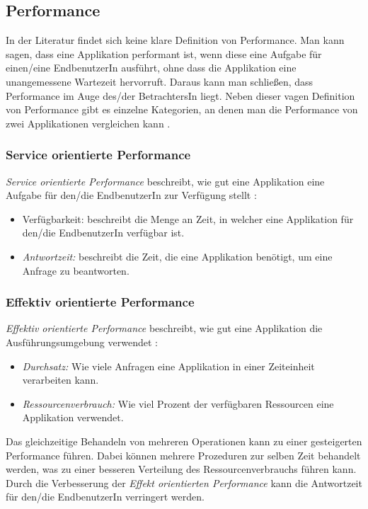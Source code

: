 \subsection{Performance}

In der Literatur findet sich keine klare Definition von Performance. Man kann sagen, dass eine Applikation performant ist, wenn diese eine Aufgabe für einen/eine EndbenutzerIn ausführt, ohne dass die Applikation eine unangemessene Wartezeit hervorruft. Daraus kann man schließen, dass Performance im Auge des/der BetrachtersIn liegt. Neben dieser vagen Definition von Performance gibt es einzelne Kategorien, an denen man die Performance von zwei Applikationen vergleichen kann \cite[p. 2]{Mol2009}. 

\subsubsection{Service orientierte Performance}

\emph{Service orientierte Performance} beschreibt, wie gut eine Applikation eine Aufgabe für den/die EndbenutzerIn zur Verfügung stellt \cite[p. 2]{Mol2009}:

\begin{itemize}
  \item {Verfügbarkeit:} beschreibt die Menge an Zeit, in welcher eine Applikation für den/die EndbenutzerIn verfügbar ist.
  \item \emph{Antwortzeit:} beschreibt die Zeit, die eine Applikation benötigt, um eine Anfrage zu beantworten.
\end{itemize}


\subsubsection{Effektiv orientierte Performance}

\emph{Effektiv orientierte Performance} beschreibt, wie gut eine Applikation die Ausführungsumgebung verwendet \cite[p. 2]{Mol2009}:

\begin{itemize}
  \item \emph{Durchsatz:} Wie viele Anfragen eine Applikation in einer Zeiteinheit verarbeiten kann.
  \item \emph{Ressourcenverbrauch:} Wie viel Prozent der verfügbaren Ressourcen eine Applikation verwendet.
\end{itemize}

Das gleichzeitige Behandeln von mehreren Operationen kann zu einer gesteigerten Performance führen. Dabei können mehrere Prozeduren zur selben Zeit behandelt werden, was zu einer besseren Verteilung des Ressourcenverbrauchs führen kann. Durch die Verbesserung der \emph{Effekt orientierten Performance} kann die Antwortzeit für den/die EndbenutzerIn verringert werden.

